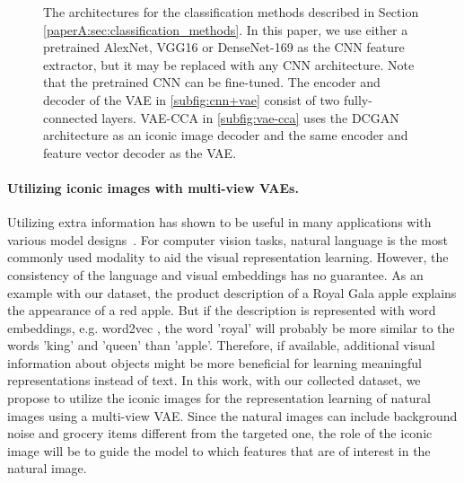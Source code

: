 \begin{figure}[t]
	\caption{The architectures for the classification methods described in Section \ref{paperA:sec:classification_methods}. In this paper, we use either a pretrained AlexNet, VGG16 or DenseNet-169 as the CNN feature extractor, but it may be replaced with any CNN architecture. Note that the pretrained CNN can be fine-tuned. The encoder and decoder of the VAE in \ref{subfig:cnn+vae} consist of two fully-connected layers. VAE-CCA in \ref{subfig:vae-cca} uses the DCGAN architecture as an iconic image decoder and the same encoder and feature vector decoder as the VAE.   }
	\label{fig:classification-methods}
\end{figure}

\vspace{-3mm}
\paragraph{Utilizing iconic images with multi-view VAEs.}
Utilizing extra information has shown to be useful in many applications with various model designs~. For computer vision tasks, natural language is the most commonly used modality to aid the visual representation learning. However, the consistency of the language and visual embeddings has no guarantee. As an example with our dataset, the product description of a Royal Gala apple explains the appearance of a red apple. But if the description is represented with word embeddings, e.g. word2vec , the word 'royal' will probably be more similar to the words 'king' and 'queen' than 'apple'. Therefore, if available, additional visual information about objects might be more beneficial for learning meaningful representations instead of text. In this work, with our collected dataset, we propose to utilize the iconic images for the representation learning of natural images using a multi-view VAE. Since the natural images can include background noise and grocery items different from the targeted one, the role of the iconic image will be to guide the model to which features that are of interest in the natural image.

